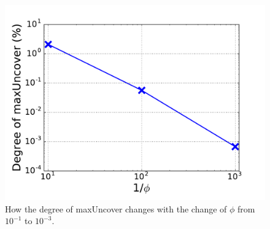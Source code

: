 \begin{figure}[!htb]
  \includegraphics[width=\linewidth]{figure/maxUncover.pdf}
  {
  How the degree of maxUncover changes with the change of $\phi$ from $10^{-1}$ to $10^{-3}$.
  }
\endminipage




\end{figure}






